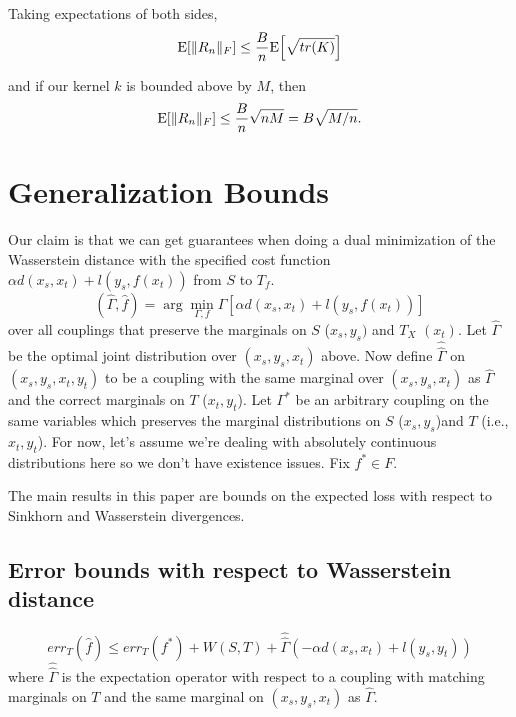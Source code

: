 Taking expectations of both sides,
$$ \E \bkt*{\norm{R_n}_{F}}\leq \frac{B}{n}\E \bkt*{\sqrt{tr(K)}} $$

and if our kernel $k$ is bounded above by $M$, then
$$ \E \bkt*{ \norm{R_n}_F } \leq \frac{B}{n} \sqrt{nM} = B\sqrt{M/n}. $$

\section{Generalization Bounds}
\label{generalization-bounds}

Our claim is that we can get guarantees when doing a dual minimization of the Wasserstein distance with the specified cost function $\alpha d(x_s,x_t) + l(y_s,f(x_t))$ from $S$ to $T_{f}$. 
\[
(\hat{\Gamma},\hat{f})=\arg\min_{\Gamma,f}\Gamma\left[\alpha d(x_{s},x_{t})+l(y_{s},f(x_{t}))\right]
\]
over all couplings that preserve the marginals on $S$ ($x_{s},y_{s})$ and $T_{X}$ $(x_{t})$. Let $\hat{\Gamma}$ be the optimal joint distribution over $(x_{s},y_{s},x_{t})$ above. Now define $\hat{\hat{\Gamma}}$ on $(x_{s},y_{s},x_{t},y_{t})$ to be a coupling with the same marginal over $(x_{s},y_{s},x_{t})$ as $\hat{\Gamma}$ and the correct marginals on $T$ ($x_t,y_t$). Let $\Gamma^{*}$ be an arbitrary coupling on the same variables which preserves the marginal distributions on $S$ ($x_{s},y_{s}$)and $T$ (i.e., $x_{t},y_t$). For now, let's assume we're dealing with absolutely continuous distributions here so we don't have existence issues. Fix $f^*\in F$.

The main results in this paper are bounds on the expected loss with respect to Sinkhorn and Wasserstein divergences.

\subsection{Error bounds with respect to Wasserstein distance}
\begin{theorem}
	\[
	err_{T}(\hat{f}) \leq err_{T}(f^{*})+W(S,T)+\hat{\hat{\Gamma}}\left(-\alpha d(x_{s},x_{t})+l(y_{s},y_{t})\right)
	\] where $\hat{\hat\Gamma}$ is the expectation operator with respect to a coupling with matching marginals on $T$ and the same marginal on $(x_s,y_s,x_t)$ as $\hat{\Gamma}$.
\end{theorem}

